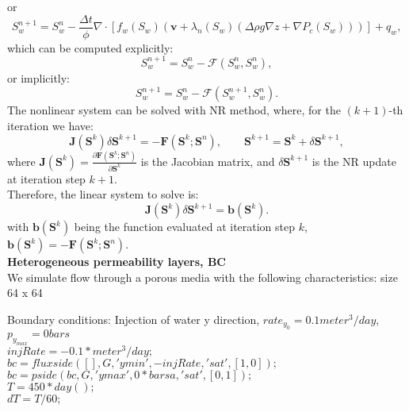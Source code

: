 \documentclass[a4paper,10pt]{report}
\begin{document}
or
\begin{equation*}\label{eq:wsat2}
 {S}_{w}^{n+1}={S}_{w}^n-\frac{\Delta t}{\phi}\nabla \cdot [f_w({S}_{w})( \mathbf{v}+\lambda_n({S}_{w})(\Delta  \rho g\nabla z+\nabla P_c({S}_{w})))]+q_w,
\end{equation*}
which can be computed explicitly:
\begin{equation*}\label{eq:wsat3}
 {S}_{w}^{n+1}={S}_{w}^n-\mathcal{F}({S}_{w}^{n},{S}_{w}^{n}),
\end{equation*}
or implicitly:
\begin{equation*}\label{eq:wsat4}
 {S}_{w}^{n+1}={S}_{w}^n-\mathcal{F}({S}_{w}^{n+1},{S}_{w}^{n}).
\end{equation*}
The nonlinear system can be solved with NR method, where, for the $(k+1)$-th iteration we have:
$$\mathbf{J}(\mathbf{S}^k)\delta\mathbf{S}^{k+1}=-\mathbf{F}(\mathbf{S}^k;\mathbf{S}^n),
\qquad \mathbf{S}^{k+1}=\mathbf{S}^k+\delta \mathbf{S}^{k+1},$$
where $\mathbf{J}(\mathbf{S}^k)=\frac{\partial \mathbf{F}(\mathbf{S}^k;\mathbf{S}^n)}{\partial \mathbf{S}^k}$ is the 
Jacobian matrix, and $\delta \mathbf{S}^{k+1}$ is the NR update at iteration step $k+1$.\\
Therefore, the linear system to solve is:\\
\begin{equation}\label{eq:lsS}
\mathbf{J}(\mathbf{S}^k)\delta \mathbf{S}^{k+1}=\mathbf{b}(\mathbf{S}^k).
\end{equation}
with $\mathbf{b}(\mathbf{S}^k)$ being the function evaluated at iteration step $k$, $\mathbf{b}(\mathbf{S}^k)=-\mathbf{F}(\mathbf{S}^k;\mathbf{S}^n)$.\\

\newpage
\textbf{Heterogeneous permeability layers, BC}\\
We simulate flow through a porous media with the following characteristics:
size 64 x 64

Boundary conditions:
Injection of water y direction, $rate_{y_0}=0.1meter^3/day$, $p_{y_{max}}=0bars$\\
$injRate = -0.1*meter^3/day;$\\
$bc = fluxside([], G, 'ymin', -injRate, 'sat', [1, 0]);$\\
$bc = pside(bc, G, 'ymax', 0*barsa, 'sat', [0, 1]);$\\
$T      = 450*day();$    \\
$dT     = T/60;$\\
\end{document}
